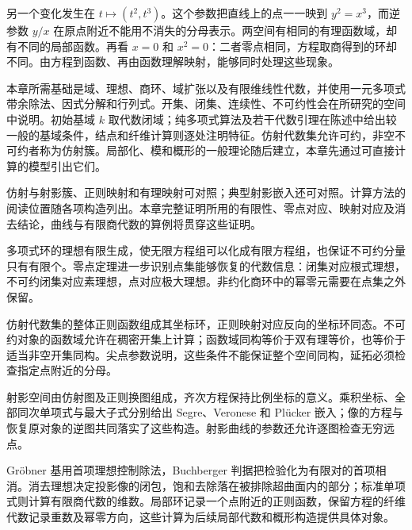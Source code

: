 另一个变化发生在 \(t\mapsto(t^2,t^3)\)。这个参数把直线上的点一一映到 \(y^2=x^3\)，而逆参数 \(y/x\) 在原点附近不能用不消失的分母表示。两空间有相同的有理函数域，却有不同的局部函数。再看 \(x=0\) 和 \(x^2=0\)：二者零点相同，方程取商得到的环却不同。由方程到函数、再由函数理解映射，能够同时处理这些现象。

\ProseParagraphBreak

本章所需基础是域、理想、商环、域扩张以及有限维线性代数，并使用一元多项式带余除法、因式分解和行列式。开集、闭集、连续性、不可约性会在所研究的空间中说明。初始基域 \(k\) 取代数闭域；纯多项式算法及若干代数引理在陈述中给出较一般的基域条件，结点和纤维计算则逐处注明特征。仿射代数集允许可约，非空不可约者称为仿射簇。局部化、模和概形的一般理论随后建立，本章先通过可直接计算的模型引出它们。

\ProseParagraphBreak

仿射与射影簇、正则映射和有理映射可对照\cite[第I章第1--4节]{Hartshorne1977}；典型射影嵌入还可对照\cite[第1章第4节]{Shafarevich2013Basic1}。计算方法的阅读位置随各项构造列出。本章完整证明所用的有限性、零点对应、映射对应及消去结论，曲线与有限商代数的算例将贯穿这些证明。







\begin{chaptersummary}
	多项式环的理想有限生成，使无限方程组可以化成有限方程组，也保证不可约分量只有有限个。零点定理进一步识别点集能够恢复的代数信息：闭集对应根式理想，不可约闭集对应素理想，点对应极大理想。非约化商环中的幂零元需要在点集之外保留。

	\ProseParagraphBreak

	仿射代数集的整体正则函数组成其坐标环，正则映射对应反向的坐标环同态。不可约对象的函数域允许在稠密开集上计算；函数域同构等价于双有理等价，也等价于适当非空开集同构。尖点参数说明，这些条件不能保证整个空间同构，延拓必须检查指定点附近的分母。

	\ProseParagraphBreak

	射影空间由仿射图及正则换图组成，齐次方程保持比例坐标的意义。乘积坐标、全部同次单项式与最大子式分别给出 Segre、Veronese 和 Plücker 嵌入；像的方程与恢复原对象的逆图共同落实了这些构造。射影曲线的参数还允许逐图检查无穷远点。

	\ProseParagraphBreak

	Gröbner 基用首项理想控制除法，Buchberger 判据把检验化为有限对的首项相消。消去理想决定投影像的闭包，饱和去除落在被排除超曲面内的部分；标准单项式则计算有限商代数的维数。局部环记录一个点附近的正则函数，保留方程的纤维代数记录重数及幂零方向，这些计算为后续局部代数和概形构造提供具体对象。
\end{chaptersummary}

